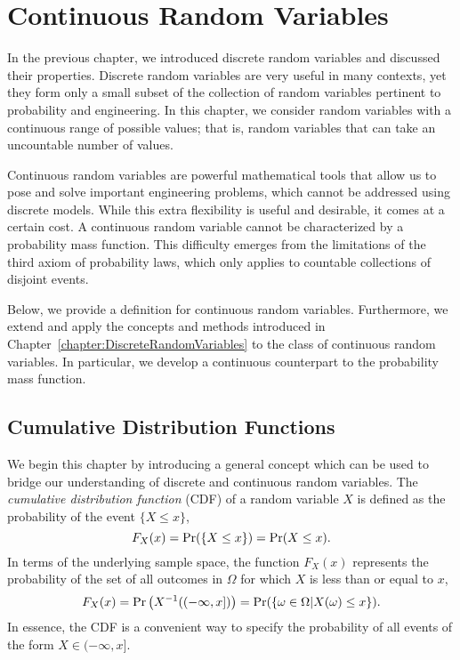 \chapter{Continuous Random Variables}

In the previous chapter, we introduced discrete random variables and discussed their properties.
Discrete random variables are very useful in many contexts, yet they form only a small subset of the collection of random variables pertinent to probability and engineering.
In this chapter, we consider random variables with a continuous range of possible values; that is, random variables that can take an uncountable number of values.

Continuous random variables are powerful mathematical tools that allow us to pose and solve important engineering problems, which cannot be addressed using discrete models.
While this extra flexibility is useful and desirable, it comes at a certain cost.
A continuous random variable cannot be characterized by a probability mass function.
This difficulty emerges from the limitations of the third axiom of probability laws, which only applies to countable collections of disjoint events.

Below, we provide a definition for continuous random variables.
Furthermore, we extend and apply the concepts and methods introduced in Chapter~\ref{chapter:DiscreteRandomVariables} to the class of continuous random variables.
In particular, we develop a continuous counterpart to the probability mass function.


\section{Cumulative Distribution Functions}

We begin this chapter by introducing a general concept which can be used to bridge our understanding of discrete and continuous random variables.
The \emph{cumulative distribution function} (CDF) of a random variable $X$ is defined as the probability of the event $\{X \leq x \}$,
\begin{equation*}
F_X (x) = \Pr ( \{ X \leq x \} ) = \Pr (X \leq x).
\end{equation*}
In terms of the underlying sample space, the function $F_X (x)$ represents the probability of the set of all outcomes in $\Omega$ for which $X$ is less than or equal to $x$,
\begin{equation*}
F_X (x) = \Pr \left( X^{-1} ( (- \infty, x]) \right)
= \Pr (\{ \omega \in \Omega | X(\omega) \leq x \}).
\end{equation*}
In essence, the CDF is a convenient way to specify the probability of all events of the form $X \in (-\infty, x]$.

